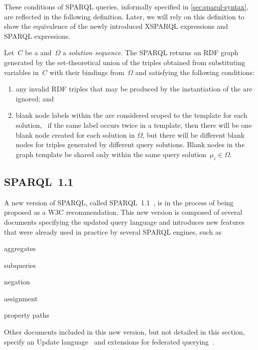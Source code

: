 %
These conditions of SPARQL \CONSTRUCT queries, informally specified in \cref{sec:sparql-syntax}, are reflected in
the following definition. 
%
Later, we will rely on this definition to show the equivalence of the newly introduced XSPARQL \CONSTRUCT expressions
and SPARQL \CONSTRUCT expressions.
%
\begin{definition}
  \label{def:sparql-construct}
  Let~$C$ be a \ConstructTemplate and~$\Omega$ a \emph{solution sequence}. The SPARQL \CONSTRUCT returns an RDF graph
  generated by the set-theoretical union of the triples obtained from substituting variables in~$C$ with their bindings
  from~$\Omega$ and satisfying the following conditions:
  \begin{enumerate}[label=(\arabic*),noitemsep]
  \item \label{def:sparql-construct-1} any invalid RDF triples that may be produced by the instantiation of the
    \ConstructTemplate are ignored; and
  \item \label{def:sparql-construct-2} blank node labels within the \ConstructTemplate are considered scoped to the
    template for each solution, \ie~if the same label occurs twice in a template, then there will be one blank node
    created for each solution in $\Omega$, but there will be different blank nodes for triples generated by different query
    solutions.  Blank nodes in the graph template be shared only within the same query solution~$\mu_i \in \Omega$.
  \end{enumerate}
\end{definition}
% 






\subsection*{SPARQL~1.1}
\label{sec:sparql-11}

A new version of SPARQL, called SPARQL~1.1~\cite{HarrisSeaborne:2012aa}, is in the process of being proposed as a \ac{W3C} recommendation.  
%
This new version is composed of several documents specifying the updated query language and introduces new features that
were already used in practice by several SPARQL engines, such as
%
\begin{enumerate*}[nosep,label=(\roman*), before=\unskip{: }, after=\unskip{.}, itemjoin={{; }}, itemjoin*={{; and }}]
\item aggregates
\item subqueries
\item negation
\item assignment
\item property paths
\end{enumerate*}
% 
Other documents included in this new version, but not detailed in this section, specify an Update
language~\cite{GearonPassantPolleres:2012aa} and extensions for federated
querying~\cite{PrudhommeauxBuil-Aranda:2011aa}.


